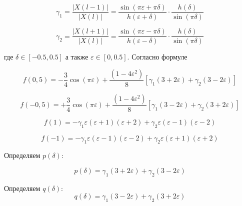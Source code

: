 \begin{equation}
	\label{eq:equation36}
	\gamma_1 = \frac{\left| X(l-1)\right|}{\left| X(l)\right|} = \frac{\sin({\pi \varepsilon + \pi \delta})}{h(\varepsilon + \delta)} \cdot \frac{h(\delta)}{\sin(\pi \delta)}
\end{equation}

\begin{equation}
	\label{eq:equation37}
	\gamma_2 = \frac{\left| X(l+1)\right|}{\left| X(l)\right|} = \frac{\sin({\pi \varepsilon - \pi \delta})}{h(\varepsilon - \delta)} \cdot \frac{h(\delta)}{\sin(\pi \delta)}
\end{equation}

где $\delta \in[-0.5,0.5]$ а также $\varepsilon\in[0,0.5]$. Согласно формуле 

\begin{equation}
	\label{eq:equation38}
	f(0,5) = -\frac{3}{4} \cos(\pi \varepsilon) + \frac{(1-4 \varepsilon^2)}{8} \left[ {\gamma_1 (3+2 \varepsilon)+\gamma_2 (3-2 \varepsilon)}\right] 
\end{equation}

\begin{equation}
	\label{eq:equation39}
	f(-0,5) = +\frac{3}{4} \cos(\pi \varepsilon) + \frac{(1-4 \varepsilon^2)}{8} \left[ {\gamma_1 (3-2 \varepsilon)+\gamma_2 (3+2 \varepsilon)}\right] 
\end{equation}

\begin{equation}
	\label{eq:equation40}
	f(1) = -\gamma_1 \varepsilon(\varepsilon+1)(\varepsilon + 2) + \gamma_2 \varepsilon(\varepsilon-1)(\varepsilon - 2)
\end{equation}

\begin{equation}
	\label{eq:equation41}
	f(-1) = -\gamma_1 \varepsilon(\varepsilon-1)(\varepsilon - 2) + \gamma_2 \varepsilon(\varepsilon+1)(\varepsilon + 2)
\end{equation}

Определяем $p(\delta)$:

\begin{equation}
	\label{eq:equation42}
	p(\delta) = \gamma_1 (3+2\varepsilon) + \gamma_2 (3-2\varepsilon)
\end{equation}

Определяем $q(\delta)$:
\begin{equation}
	\label{eq:equation43}
	q(\delta) = \gamma_1 (3-2\varepsilon) + \gamma_2 (3+2\varepsilon)
\end{equation}


